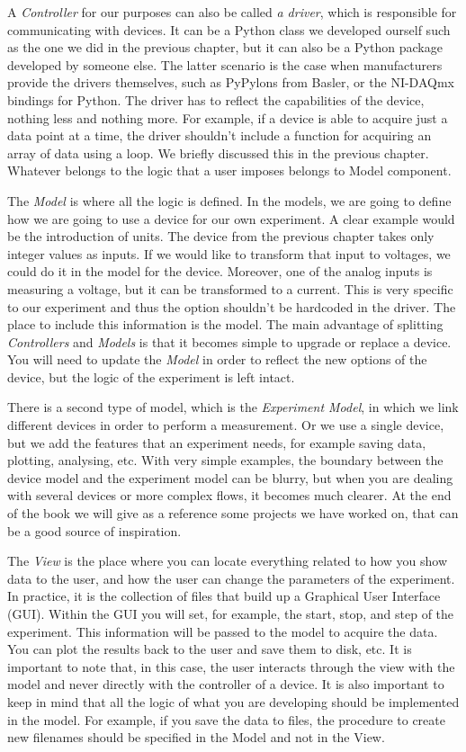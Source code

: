 A \emph{Controller} for our purposes can also be called \emph{a driver}, which is responsible for communicating with devices. It can be a Python class we developed ourself such as the one we did in the previous chapter, but it can also be a Python package developed by someone else. The latter scenario is the case when manufacturers provide the drivers themselves, such as PyPylons from Basler, or the NI-DAQmx bindings for Python. The driver has to reflect the capabilities of the device, nothing less and nothing more. For example, if a device is able to acquire just a data point at a time, the driver shouldn't include a function for acquiring an array of data using a loop. We briefly discussed this in the previous chapter. Whatever belongs to the logic that a user imposes belongs to Model component.

The \emph{Model} is where all the logic is defined. In the models, we are going to define how we are going to use a device for our own experiment. A clear example would be the introduction of units. The device from the previous chapter takes only integer values as inputs. If we would like to transform that input to voltages, we could do it in the model for the device. Moreover, one of the analog  inputs is measuring a voltage, but it can be transformed to a current. This is very specific to our experiment and thus the option shouldn't be hardcoded in the driver. The place to include this information is the model. The main advantage of splitting \emph{Controllers} and \emph{Models} is that it becomes simple to upgrade or replace a device. You will need to update the \emph{Model} in order to reflect the new options of the device, but the logic of the experiment is left intact.

There is a second type of model, which is the \emph{Experiment Model}, in which we link different devices in order to perform a measurement. Or we use a single device, but we add the features that an experiment needs, for example saving data, plotting, analysing, etc. With very simple examples, the boundary between the device model and the experiment model can be blurry, but when you are dealing with several devices or more complex flows, it becomes much clearer. At the end of the book we will give as a reference some projects we have worked on, that can be a good source of inspiration.

The \emph{View} is the place where you can locate everything related to how you show data to the user, and how the user can change the parameters of the experiment. In practice, it is the collection of files that build up a Graphical User Interface ({GUI}). Within the {GUI} you will set, for example, the start, stop, and step of the experiment. This information will be passed to the model to acquire the data. You can plot the results back to the user and save them to disk, etc. It is important to note that, in this case, the user interacts through the view with the model and never directly with the controller of a device. It is also important to keep in mind that all the logic of what you are developing should be implemented in the model. For example, if you save the data to files, the procedure to create new filenames should be specified in the Model and not in the View.

